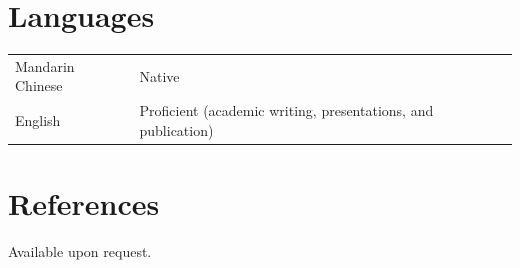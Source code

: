 \documentclass[11pt, letterpaper]{article}
\begin{document}
\section{Languages}

\begin{tabular}{@{}ll}
  Mandarin Chinese & Native \\
  English          & Proficient (academic writing, presentations, and publication) \\
\end{tabular}

\section{References}

Available upon request.
\end{document}
